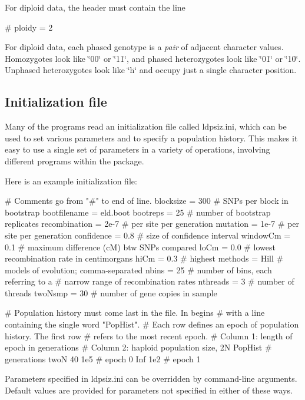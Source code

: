 For diploid data, the header must contain the line \begin{DoxyVerb}# ploidy                = 2
\end{DoxyVerb}


For diploid data, each phased genotype is a {\itshape pair} of adjacent character values. Homozygotes look like \char`\"{}00\char`\"{} or \char`\"{}11\char`\"{}, and phased heterozygotes look like \char`\"{}01\char`\"{} or \char`\"{}10\char`\"{}. Unphased heterozygotes look like \char`\"{}h\char`\"{} and occupy just a single character position.

\subsection*{Initialization file}

Many of the programs read an initialization file called {\ttfamily ldpsiz.\-ini}, which can be used to set various parameters and to specify a population history. This makes it easy to use a single set of parameters in a variety of operations, involving different programs within the package.

Here is an example initialization file\-: \begin{DoxyVerb}# Comments go from "#" to end of line.
blocksize       = 300  # SNPs per block in bootstrap
bootfilename    = eld.boot
bootreps        = 25   # number of bootstrap replicates
recombination   = 2e-7 # per site per generation
mutation        = 1e-7 # per site per generation
confidence      = 0.8  # size of confidence interval
windowCm        = 0.1  # maximum difference (cM) btw SNPs compared
loCm            = 0.0  # lowest recombination rate in centimorgans
hiCm            = 0.3  # highest
methods         = Hill # models of evolution; comma-separated
nbins           = 25   # number of bins, each referring to a 
                       # narrow range of recombination rates
nthreads        = 3    # number of threads
twoNsmp         = 30   # number of gene copies in sample

# Population history must come last in the file. In begins 
# with a line containing the single word "PopHist".
# Each row defines an epoch of population history. The first row
# refers to the most recent epoch.
# Column 1: length of epoch in generations
# Column 2: haploid population size, 2N
PopHist
# generations twoN
           40  1e5   # epoch 0
          Inf  1e2   # epoch 1
\end{DoxyVerb}


Parameters specified in {\ttfamily ldpsiz.\-ini} can be overridden by command-\/line arguments. Default values are provided for parameters not specified in either of these ways.

